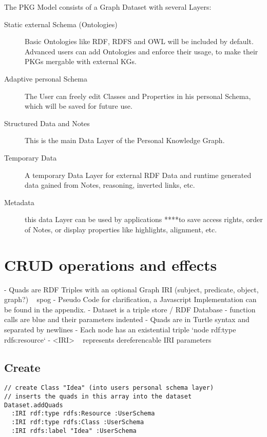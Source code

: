 The PKG Model consists of a Graph Dataset with several Layers:
\begin{description}
\item[Static external Schema (Ontologies)]Basic Ontologies like RDF, RDFS and OWL will be included by default. Advanced users can add Ontologies and enforce their usage, to make their PKGs mergable with external KGs.

\item[Adaptive personal Schema]The User can freely edit Classes and Properties in his personal Schema, which will be saved for future use.

\item[Structured Data and Notes]This is the main Data Layer of the Personal Knowledge Graph.

\item[Temporary Data]A temporary Data Layer for external RDF Data and runtime generated data gained from Notes, reasoning, inverted links, etc.

\item[Metadata]this data Layer can be used by applications ****to save access rights, order of Notes, or display properties like highlights, alignment, etc.
\end{description}


\section{CRUD operations and effects}

- Quads are RDF Triples with an optional Graph IRI 
(subject, predicate, object, graph?) ~ spog
- Pseudo Code for clarification, a Javascript Implementation can be found in the appendix.
    - Dataset is a triple store / RDF Database
    - function calls are blue and their parameters indented
    - Quads are in Turtle syntax and separated by newlines
    - Each node has an existential triple `node rdf:type rdfs:resource`
    - <IRI> ~ represents dereferencable IRI parameters

\subsection*{Create}

\begin{lstlisting}
// create Class "Idea" (into users personal schema layer)
// inserts the quads in this array into the dataset
Dataset.addQuads
  :IRI rdf:type rdfs:Resource :UserSchema
  :IRI rdf:type rdfs:Class :UserSchema
  :IRI rdfs:label "Idea" :UserSchema
\end{lstlisting}

